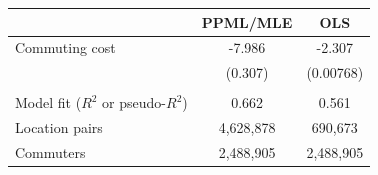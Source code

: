 \begin{tabular}{lcc} \toprule
&PPML/MLE & OLS \\ \midrule
Commuting cost & -7.986 & -2.307 \\
 & (0.307) & (0.00768) \\
 &  &  \\
Model fit ($R^2$ or pseudo-$R^2$) & 0.662 & 0.561 \\
Location pairs & 4,628,878 & 690,673 \\
 Commuters & 2,488,905 & 2,488,905 \\ \bottomrule
\end{tabular}
